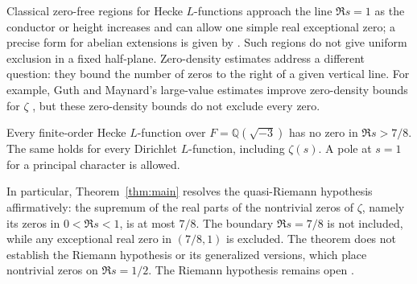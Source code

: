 Classical zero-free regions for Hecke $L$-functions approach the line
$\Re s=1$ as the conductor or height increases and can allow one
simple real exceptional zero; a precise form for abelian extensions is given
by \cite[Theorem 3.1]{TZ}. Such regions do not give uniform exclusion in
a fixed half-plane. Zero-density estimates address a different question:
they bound the number of zeros to the right of a given vertical line.
For example, Guth and Maynard's large-value estimates improve zero-density
bounds for $\zeta$ \cite[Theorem 1.2]{GM}, but these zero-density bounds
do not exclude every zero.

\begin{theorem}\label{thm:main}
Every finite-order Hecke $L$-function over
$F=\mathbb Q(\sqrt{-3})$ has no zero in $\Re s>7/8$.
The same holds for every Dirichlet $L$-function, including $\zeta(s)$.
A pole at $s=1$ for a principal character is allowed.
\end{theorem}

In particular, Theorem~\ref{thm:main} resolves the quasi-Riemann
hypothesis affirmatively: the supremum of the real parts of the
nontrivial zeros of $\zeta$, namely its zeros in $0<\Re s<1$, is at most
$7/8$. The boundary $\Re s=7/8$ is not included, while any exceptional
real zero in $(7/8,1)$ is excluded. The theorem does not establish the
Riemann hypothesis or its generalized versions, which place nontrivial
zeros on $\Re s=1/2$. The Riemann hypothesis remains open \cite{Clay}.
